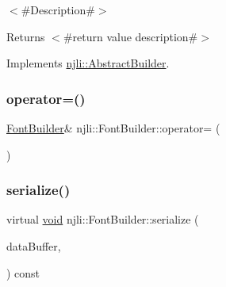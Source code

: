 $<$\#\+Description\#$>$

\begin{DoxyReturn}{Returns}
$<$\#return value description\#$>$ 
\end{DoxyReturn}


Implements \mbox{\hyperlink{classnjli_1_1_abstract_builder_a3e6e553e06d1ca30517ad5fb0bd4d000}{njli\+::\+Abstract\+Builder}}.

\mbox{\label{classnjli_1_1_font_builder_a4115c1b65ceb0c0f1cc38b94f923ede8}} 
\subsubsection{\texorpdfstring{operator=()}{operator=()}}
{\footnotesize\ttfamily \mbox{\hyperlink{classnjli_1_1_font_builder}{Font\+Builder}}\& njli\+::\+Font\+Builder\+::operator= (\begin{DoxyParamCaption}\item[{const \mbox{\hyperlink{classnjli_1_1_font_builder}{Font\+Builder}} \&}]{ }\end{DoxyParamCaption})\hspace{0.3cm}{\ttfamily [protected]}}

\mbox{\label{classnjli_1_1_font_builder_aa0ec493a1c0501769f492df57ea6e8f5}} 
\subsubsection{\texorpdfstring{serialize()}{serialize()}}
{\footnotesize\ttfamily virtual \mbox{\hyperlink{_thread_8h_af1e856da2e658414cb2456cb6f7ebc66}{void}} njli\+::\+Font\+Builder\+::serialize (\begin{DoxyParamCaption}\item[{\mbox{\hyperlink{_thread_8h_af1e856da2e658414cb2456cb6f7ebc66}{void}} $\ast$}]{data\+Buffer,  }\item[{bt\+Serializer $\ast$}]{ }\end{DoxyParamCaption}) const\hspace{0.3cm}{\ttfamily [virtual]}}



